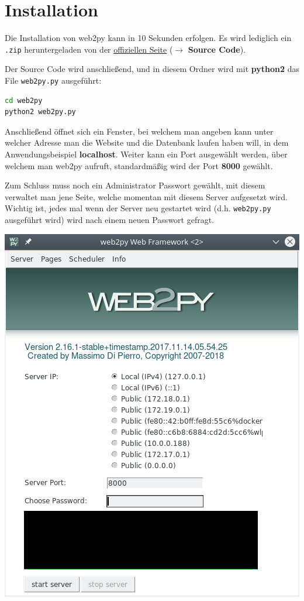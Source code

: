 
\section{Installation}
Die Installation von web2py kann in 10 Sekunden erfolgen. Es wird lediglich ein \verb|.zip| heruntergeladen von der
\underline{\href{http://www.web2py.com/init/default/download}{offiziellen Seite}} ($\rightarrow$ \textbf{Source Code}).

Der Source Code wird anschließend, und in diesem Ordner wird mit \textbf{python2} das File \verb|web2py.py| ausgeführt:

\begin{lstlisting}[language=bash]
cd web2py
python2 web2py.py
\end{lstlisting}

Anschließend öffnet sich ein Fenster, bei welchem man angeben kann unter welcher Adresse man die Website und die Datenbank laufen haben will, in dem Anwendungsbeispiel \textbf{localhost}. Weiter kann ein Port ausgewählt werden, über welchem man web2py aufruft, standardmäßig wird der Port \textbf{8000} gewählt. 

Zum Schluss muss noch ein Administrator Passwort gewählt, mit diesem verwaltet man jene Seite, welche momentan mit diesem Server aufgesetzt wird. Wichtig ist, jedes mal wenn der Server neu gestartet wird (d.h. \verb|web2py.py| ausgeführt wird) wird nach einem neuen Passwort gefragt.

\begin{minipage}{\linewidth}
	\centering
	\includegraphics[width=0.5\linewidth]{images/start}
\end{minipage}

